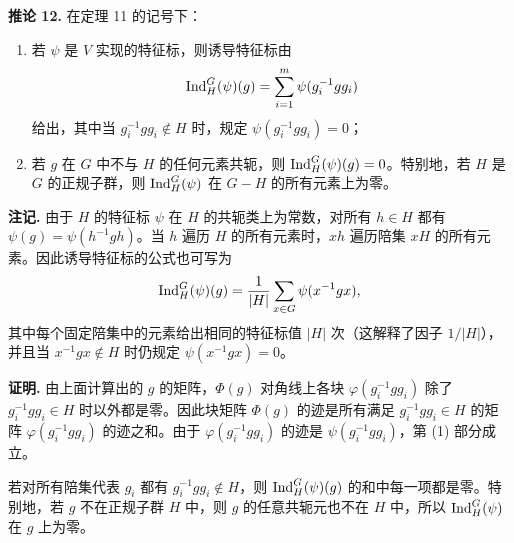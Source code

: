 \noindent\textbf{推论 12.} 在定理 11 的记号下：
\begin{enumerate}[label=(\arabic*)]
  \item 若 $\psi$ 是 $V$ 实现的特征标，则诱导特征标由
  \[
    \operatorname{Ind}_H^G(\psi)(g)=\sum_{i=1}^m \psi(g_i^{-1}gg_i)
  \]
  给出，其中当 $g_i^{-1}gg_i\notin H$ 时，规定 $\psi(g_i^{-1}gg_i)=0$；
  \item 若 $g$ 在 $G$ 中不与 $H$ 的任何元素共轭，则 $\operatorname{Ind}_H^G(\psi)(g)=0$。特别地，若 $H$ 是 $G$ 的正规子群，则 $\operatorname{Ind}_H^G(\psi)$ 在 $G-H$ 的所有元素上为零。
\end{enumerate}

\noindent\textbf{注记.} 由于 $H$ 的特征标 $\psi$ 在 $H$ 的共轭类上为常数，对所有 $h\in H$ 都有 $\psi(g)=\psi(h^{-1}gh)$。当 $h$ 遍历 $H$ 的所有元素时，$xh$ 遍历陪集 $xH$ 的所有元素。因此诱导特征标的公式也可写为
\[
  \operatorname{Ind}_H^G(\psi)(g)=\frac1{|H|}\sum_{x\in G}\psi(x^{-1}gx),
\]
其中每个固定陪集中的元素给出相同的特征标值 $|H|$ 次（这解释了因子 $1/|H|$），并且当 $x^{-1}gx\notin H$ 时仍规定 $\psi(x^{-1}gx)=0$。

\noindent\textbf{证明.} 由上面计算出的 $g$ 的矩阵，$\Phi(g)$ 对角线上各块 $\varphi(g_i^{-1}gg_i)$ 除了 $g_i^{-1}gg_i\in H$ 时以外都是零。因此块矩阵 $\Phi(g)$ 的迹是所有满足 $g_i^{-1}gg_i\in H$ 的矩阵 $\varphi(g_i^{-1}gg_i)$ 的迹之和。由于 $\varphi(g_i^{-1}gg_i)$ 的迹是 $\psi(g_i^{-1}gg_i)$，第 (1) 部分成立。

若对所有陪集代表 $g_i$ 都有 $g_i^{-1}gg_i\notin H$，则 $\operatorname{Ind}_H^G(\psi)(g)$ 的和中每一项都是零。特别地，若 $g$ 不在正规子群 $H$ 中，则 $g$ 的任意共轭元也不在 $H$ 中，所以 $\operatorname{Ind}_H^G(\psi)$ 在 $g$ 上为零。

